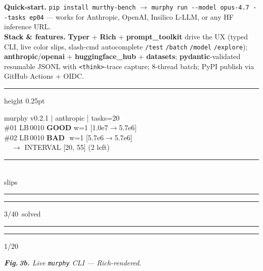 \documentclass[10pt,letterpaper]{article}
\newcommand{\figcap}[1]{{\fontsize{6.2pt}{7pt}\selectfont\itshape\color{phgray}#1\par}}
\newcommand{\tool}[1]{\textbf{\color{bamboodark}#1}}
\begin{document}
\begin{minipage}[t]{0.325\textwidth}
\begin{tcolorbox}[solutionbox, title={\faTerminal\ \,3.~CLI --- \texttt{pip install murthy-bench}}]
\raggedright\fontsize{6.7pt}{8pt}\selectfont
\textbf{Quick-start.} \texttt{pip install murthy-bench} $\rightarrow$ \texttt{murphy run -{}-model opus-4.7 -{}-tasks ep04} --- works for Anthropic, OpenAI, Insilico L-LLM, or any HF inference URL.\\[1.5pt]
\textbf{Stack \& features.} \tool{Typer} + \tool{Rich} + \tool{prompt\_toolkit} drive the UX (typed CLI, live color slips, slash-cmd autocomplete \texttt{/test} \texttt{/batch} \texttt{/model} \texttt{/explore}); \tool{anthropic}/\tool{openai} + \tool{huggingface\_hub} + \tool{datasets}; \tool{pydantic}-validated resumable JSONL with \texttt{<think>}-trace capture; 8-thread batch; PyPI publish via GitHub Actions + OIDC.\\[2pt]
{\color{bamboomid}\hrule height 0.25pt}
\vspace{1pt}
\begin{tcolorbox}[termbox, title={\$ murphy run -{}-model sonnet-4-6 -{}-tasks ep04}, height=2.45cm, valign=top]
{\color{termdim}murphy v0.2.1 | anthropic | tasks=20}\\[0.5pt]
{\color{termlabel}\#01} LB\,0010 {\color{termgood}\textbf{GOOD}} w=1 {\color{termint}[1.0e7$\to$5.7e6]}\\
{\color{termlabel}\#02} LB\,0010 {\color{termbad}\textbf{BAD}}\ \,w=1 {\color{termint}[5.7e6$\to$5.7e6]}\\
~~$\to$ {\color{termint}INTERVAL [20, 55]} {\color{termdim}(2 left)}\\[-0.5pt]
{\color{termdim}\rule{\linewidth}{0.25pt}}\\[-1.5pt]
slips {\color{termgood}\rule{5mm}{3.5pt}}{\color{termdim}\rule{5mm}{3.5pt}} 3/40\ solved {\color{termgood}\rule{2mm}{3.5pt}}{\color{termdim}\rule{8mm}{3.5pt}} 1/20
\end{tcolorbox}
\figcap{\textbf{Fig.\,3b.} Live \texttt{murphy} CLI --- Rich-rendered.}
\end{tcolorbox}
\end{minipage}
\end{document}
